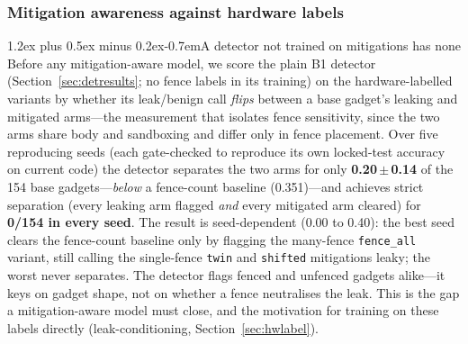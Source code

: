 \documentclass[conference]{IEEEtran}
\makeatletter
\renewcommand\paragraph{\@startsection{paragraph}{4}{\z@}%
  {1.2ex plus 0.5ex minus 0.2ex}{-0.7em}{\normalfont\normalsize\bfseries}}
\makeatother
\begin{document}
\subsubsection{Mitigation awareness against hardware labels}
\label{sec:hw-mitig}

\paragraph{A detector not trained on mitigations has none}
Before any mitigation-aware model, we score the plain B1 detector
(Section~\ref{sec:detresults}; no fence labels in its training) on the
hardware-labelled variants by whether its leak/benign call \emph{flips} between
a base gadget's leaking and mitigated arms---the measurement that isolates
fence sensitivity, since the two arms share body and sandboxing and differ only
in fence placement. Over five reproducing seeds (each gate-checked to reproduce
its own locked-test accuracy on current code) the detector separates the two
arms for only \textbf{0.20\,$\pm$\,0.14} of the 154 base gadgets---\emph{below}
a fence-count baseline (0.351)---and achieves strict separation (every leaking
arm flagged \emph{and} every mitigated arm cleared) for \textbf{0/154 in every
seed}. The result is seed-dependent (0.00 to 0.40): the best seed clears the
fence-count baseline only by flagging the many-fence \texttt{fence\_all}
variant, still calling the single-fence \texttt{twin} and \texttt{shifted}
mitigations leaky; the worst never separates. The detector flags fenced and
unfenced gadgets alike---it keys on gadget shape, not on whether a fence
neutralises the leak. This is the gap a mitigation-aware model must close, and
the motivation for training on these labels directly (leak-conditioning,
Section~\ref{sec:hwlabel}).
\end{document}
